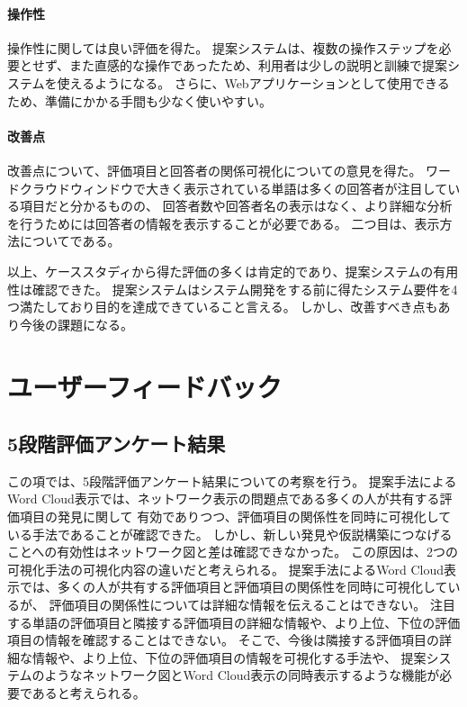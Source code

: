 \documentclass[syuuron]{kuee}
\begin{document}
		\paragraph{操作性}
		操作性に関しては良い評価を得た。
		提案システムは、複数の操作ステップを必要とせず、また直感的な操作であったため、利用者は少しの説明と訓練で提案システムを使えるようになる。
		さらに、Webアプリケーションとして使用できるため、準備にかかる手間も少なく使いやすい。
		
		\paragraph{改善点}
		改善点について、評価項目と回答者の関係可視化についての意見を得た。
		ワードクラウドウィンドウで大きく表示されている単語は多くの回答者が注目している項目だと分かるものの、
		回答者数や回答者名の表示はなく、より詳細な分析を行うためには回答者の情報を表示することが必要である。
		二つ目は、表示方法についてである。
		
		以上、ケーススタディから得た評価の多くは肯定的であり、提案システムの有用性は確認できた。
		提案システムはシステム開発をする前に得たシステム要件を4つ満たしており目的を達成できていること言える。
		しかし、改善すべき点もあり今後の課題になる。
		
	\section{ユーザーフィードバック}
		\subsection{5段階評価アンケート結果}
		この項では、5段階評価アンケート結果についての考察を行う。
		提案手法によるWord Cloud表示では、ネットワーク表示の問題点である多くの人が共有する評価項目の発見に関して
		有効でありつつ、評価項目の関係性を同時に可視化している手法であることが確認できた。
		しかし、新しい発見や仮説構築につなげることへの有効性はネットワーク図と差は確認できなかった。
		この原因は、2つの可視化手法の可視化内容の違いだと考えられる。
		提案手法によるWord Cloud表示では、多くの人が共有する評価項目と評価項目の関係性を同時に可視化しているが、
		評価項目の関係性については詳細な情報を伝えることはできない。
		注目する単語の評価項目と隣接する評価項目の詳細な情報や、より上位、下位の評価項目の情報を確認することはできない。
		そこで、今後は隣接する評価項目の詳細な情報や、より上位、下位の評価項目の情報を可視化する手法や、
		提案システムのようなネットワーク図とWord Cloud表示の同時表示するような機能が必要であると考えられる。
		
\end{document}
